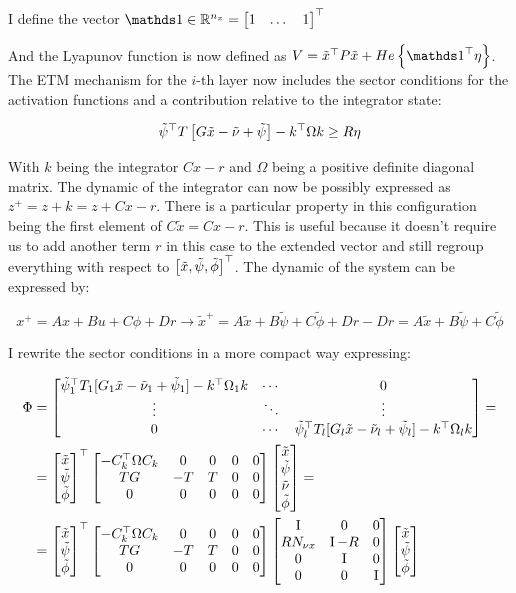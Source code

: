 \documentclass{article}
\begin{document}
I define the vector $\one \in \RR^{n_{x}} = \bmx{1 & \dots & 1}\tr$

And the Lyapunov function is now defined as $V = \tilde{x}\tr P \tilde{x} + He \left\{ \one\tr \eta \right\}$.
The ETM mechanism for the $i$-th layer now includes the sector conditions for the activation functions and a contribution relative to the integrator state:

$$
  \tilde{\psi}^\top T \left[ G \tilde{x} - \tilde{\nu} + \tilde{\psi} \right] - k^\top \Omega k \geq R \eta
$$

With $k$ being the integrator $C x - r$ and $\Omega$ being a positive definite diagonal matrix. The dynamic of the integrator can now be possibly expressed as $z^{+} = z + k = z + C x - r$. There is a particular property in this configuration being the first element of $C \tilde{x} = C x - r$. This is useful because it doesn't require us to add another term $r$ in this case to the extended vector and still regroup everything with respect to $\left[ \tilde{x}, \tilde{\psi}, \tilde{\phi} \right]^\top$.
The dynamic of the system can be expressed by:

$$
  x^{+} = A x + B u + C \phi + D r \to \tilde{x}^{+} = A \tilde{x} + B \tilde{\psi} + C \tilde{\phi} + D r - D r = A \tilde{x} + B \tilde{\psi} + C \tilde{\phi}
$$

I rewrite the sector conditions in a more compact way expressing:

\begin{align*}
  \Phi &= \left[\begin{matrix}
    \tilde{\psi}_{1}^\top T_{1} [G_{1} \tilde{x} - \tilde{\nu}_{1} + \tilde{\psi}_{1}] - k^\top \Omega_{1} k  & \cdots & 0 \\
    \vdots & \ddots & \vdots \\
    0 & \cdots & \tilde{\psi}_{l}^\top T_{l} [G_{l} \tilde{x} - \tilde{\nu}_{l} + \tilde{\psi}_{l}] - k^\top \Omega_{l} k
  \end{matrix}\right] = \\
  &= \left[\begin{matrix}
    \tilde{x} \\
    \tilde{\psi} \\
    \tilde{\phi}
  \end{matrix}\right]^\top \left[\begin{matrix}
    -C_{k}^\top \Omega C_{k} & 0 & 0 & 0 & 0 \\
    TG & -T & T & 0 & 0 \\
    0 & 0 & 0 & 0 & 0 
  \end{matrix}\right] \left[\begin{matrix}
    \tilde{x} \\
    \tilde{\psi} \\
    \tilde{\nu} \\
    \tilde{\phi} \\
  \end{matrix}\right] = \\
  &= \left[\begin{matrix}
    \tilde{x} \\
    \tilde{\psi} \\
    \tilde{\phi}
  \end{matrix}\right]^\top \left[\begin{matrix}
    -C_{k}^\top \Omega C_{k} & 0 & 0 & 0 & 0 \\
    TG & -T & T & 0 & 0 \\
    0 & 0 & 0 & 0 & 0 
  \end{matrix}\right] \left[\begin{matrix}
    \operatorname{I} & 0 & 0 \\
    R N_{\nu x} & \operatorname{I} - R & 0 \\
    0 & \operatorname{I} & 0 \\
    0 & 0 & \operatorname{I} 
  \end{matrix}\right] \left[\begin{matrix}
    \tilde{x} \\
    \tilde{\psi} \\
    \tilde{\phi}
  \end{matrix}\right]
\end{align*}
\end{document}
